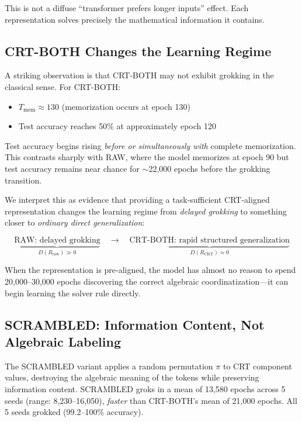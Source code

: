 This is not a diffuse ``transformer prefers longer inputs'' effect. Each representation solves precisely the mathematical information it contains.


\subsection{CRT-BOTH Changes the Learning Regime}
\label{sec:learning_regime}

A striking observation is that CRT-BOTH may not exhibit grokking in the classical sense. For CRT-BOTH:
\begin{itemize}[leftmargin=*]
    \item $T_{\mathrm{mem}} \approx 130$ (memorization occurs at epoch 130)
    \item Test accuracy reaches 50\% at approximately epoch 120
\end{itemize}

Test accuracy begins rising \emph{before or simultaneously with} complete memorization. This contrasts sharply with RAW, where the model memorizes at epoch 90 but test accuracy remains near chance for $\sim$22,000 epochs before the grokking transition.

We interpret this as evidence that providing a task-sufficient CRT-aligned representation changes the learning regime from \emph{delayed grokking} to something closer to \emph{ordinary direct generalization}:

\begin{equation}
    \underbrace{\text{RAW: delayed grokking}}_{D(R_{\mathrm{raw}}) \gg 0}
    \quad \longrightarrow \quad
    \underbrace{\text{CRT-BOTH: rapid structured generalization}}_{D(R_{\mathrm{CRT}}) \approx 0}
\end{equation}

When the representation is pre-aligned, the model has almost no reason to spend 20,000--30,000 epochs discovering the correct algebraic coordinatization---it can begin learning the solver rule directly.


\subsection{SCRAMBLED: Information Content, Not Algebraic Labeling}
\label{sec:scrambled}

The SCRAMBLED variant applies a random permutation $\pi$ to CRT component values, destroying the algebraic meaning of the tokens while preserving information content. SCRAMBLED groks in a mean of 13,580 epochs across 5 seeds (range: 8,230--16,050), \emph{faster} than CRT-BOTH's mean of 21,000 epochs. All 5 seeds grokked (99.2--100\% accuracy).


